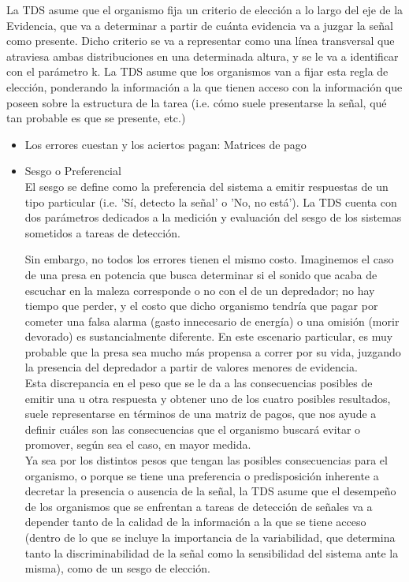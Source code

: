 \begin{itemize}
La TDS asume que el organismo fija un criterio de elección a lo largo del eje de la Evidencia, que va a determinar a partir de cuánta evidencia va a juzgar la señal como presente. Dicho criterio se va a representar como una línea transversal que atraviesa ambas distribuciones en una determinada altura, y se le va a identificar con el parámetro k. La TDS asume que los organismos van a fijar esta regla de elección, ponderando la información a la que tienen acceso con la información que poseen sobre la estructura de la tarea (i.e. cómo suele presentarse la señal, qué tan probable es que se presente, etc.)\\

    \begin{itemize}
      \item{Los errores cuestan y los aciertos pagan: Matrices de pago}\\

      \item{Sesgo o Preferencial}\\

  El sesgo se define como la preferencia del sistema a emitir respuestas de un tipo particular (i.e. 'Sí, detecto la señal' o 'No, no está'). La TDS cuenta con dos parámetros dedicados a la medición y evaluación del sesgo de los sistemas sometidos a tareas de detección.

 Sin embargo, no todos los errores tienen el mismo costo. Imaginemos el caso de una presa en potencia que busca determinar si el sonido que acaba de escuchar en la maleza corresponde o no con el de un depredador; no hay tiempo que perder, y el costo que dicho organismo tendría que pagar por cometer una falsa alarma (gasto innecesario de energía) o una omisión (morir devorado) es sustancialmente diferente. En este escenario particular, es muy probable que la presa sea mucho más propensa a correr por su vida, juzgando la presencia del depredador a partir de valores menores de evidencia.\\

Esta discrepancia en el peso que se le da a las consecuencias posibles de emitir una u otra respuesta y obtener uno de los cuatro posibles resultados, suele representarse en términos de una matriz de pagos, que nos ayude a definir cuáles son las consecuencias que el organismo buscará evitar o promover, según sea el caso, en mayor medida.\\

Ya sea por los distintos pesos que tengan las posibles consecuencias para el organismo, o porque se tiene una preferencia o predisposición inherente a decretar la presencia o ausencia de la señal, la TDS asume que el desempeño de los organismos que se enfrentan a tareas de detección de señales va a depender tanto de la calidad de la información a la que se tiene acceso (dentro de lo que se incluye la importancia de la variabilidad, que determina tanto la discriminabilidad de la señal como la sensibilidad del sistema ante la misma), como de un sesgo de elección.\\


\end{itemize}
\end{itemize}
